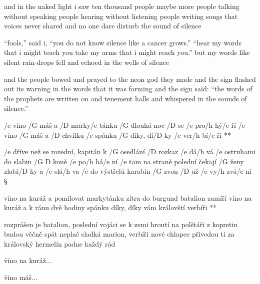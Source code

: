 and in the naked light i saw
ten thousand people maybe more
people talking without speaking
people hearing without listening
people writing songs that voices never shared
and no one dare disturb the sound of silence \s

``fools,'' said i, ``you do not know
silence like a cancer grows.''
``hear my words that i might teach you
take my arms that i might reach you.''
but my words like silent rain-drops fell
and echoed in the wells of silence \s

and the people bowed and prayed
to the neon god they made
and the sign flashed out its warning
in the words that it was forming
and the sign said: ``the words of the prophets are written on 
and tenement halls
and whispered in the sounds of silence.''




\R  /e víno /G máš a /D marky/e tánku
    /G dlouhá noc /D se /e pro/h hý/e ří
   /e víno /G máš a /D chvilku /e spánku
    /G díky, dí/D ky /e ver/h bí/e ři **

/e dříve než se rozední, kapitán k /G osedlání /D rozkaz /e dá/h vá
/e ostruhami do slabin /{G D} koně /e po/h há/e ní
/e tam na straně polední čekají /G ženy zlaťá/D ky a /e slá/h va
/e do výstřelů karabin /G zvon /D už /e vy/h zvá/e ní \S

\R víno na kuráž a pomilovat markytánku
   zítra do burgund batalion zamíří
   víno na kuráž a k ránu dvě hodiny spánku
   díky, díky vám královští verbíři **

rozprášen je batalion, poslední vojáci se k zemi hroutí
na polštáři z kopretin budou věčně spát
neplač sladká marion, verbíři nové chlapce přivedou ti
za královský hermelín padne každý rád \s

\r víno na kuráž...

\r víno máš...



\bye
